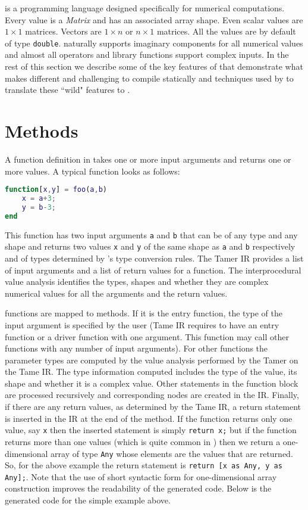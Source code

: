 \matlab is a programming language designed specifically for numerical
computations. Every value is a \emph{Matrix} and has an associated array
shape.  Even scalar values are $1\times1$ matrices. Vectors are
$1\times n$ or $n \times 1$ matrices. All the values are by default of
type \verb+double+.  \matlab naturally supports imaginary components for
all numerical values and almost all operators and library functions
support complex inputs. In the rest of this section we describe some of
the key features of \matlab that demonstrate what makes \matlab 
different and challenging to compile statically and techniques used by
\mixten to translate these ``wild" features to \xten.

\section{Methods}

A function definition in \matlab takes one or more input arguments and
returns one or more values. A typical \matlab function looks as follows:

\begin{lstlisting}[language=Matlab,numbers=none]
function[x,y] = foo(a,b)
    x = a+3;
    y = b-3;
end
\end{lstlisting}

This function has two input arguments \verb|a| and \verb|b| that
can be of any type and any shape and returns two values \verb|x| and
\verb|y| of the same shape as \verb|a| and \verb|b| respectively and of
types determined by \matlab's type conversion rules. The Tamer IR
provides a list of input arguments and a list of return values for a
function. The interprocedural value analysis identifies the types,
shapes and whether they are complex numerical values for all the
arguments and the return values.

\matlab functions are mapped to \xten methods. If it is the entry
function, the type of the input argument is specified by the user (Tame
IR requires to have an entry function or a driver function with one
argument. This function may call other functions with any number of
input arguments). For other functions the parameter types are computed
by the value analysis performed by the Tamer on the Tame IR. The type
information computed includes the type of the value, its shape and
whether it is a complex value. Other statements in the function block
are processed recursively and corresponding nodes are created in the
\xten IR. Finally, if there are any return values, as determined by the
Tame IR, a return statement is inserted in the \xten IR at the end of
the method. If the function returns only one value, say \verb|x| then
the inserted statement is simply \verb|return x;| but if the function
returns more than one values (which is quite common in \matlab) then we
return a one-dimensional array of type \verb|Any| whose elements are the
values that are returned. So, for the above example the return statement
is \verb|return [x as Any, y as Any];|. Note that the use of short syntactic form
for one-dimensional array construction improves the readability of the
generated code. Below is the generated code for the simple example
above.

